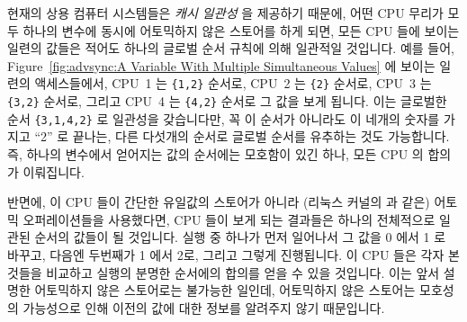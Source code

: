 현재의 상용 컴퓨터 시스템들은 \emph{캐시 일관성} 을 제공하기 때문에, 어떤 CPU
무리가 모두 하나의 변수에 동시에 어토믹하지 않은 스토어를 하게 되면, 모든 CPU
들에 보이는 일련의 값들은 적어도 하나의 글로벌 순서 규칙에 의해 일관적일
것입니다.
예를 들어,
Figure~\ref{fig:advsync:A Variable With Multiple Simultaneous Values} 에 보이는
일련의 액세스들에서,
CPU~1 는 {\tt \{1,2\}} 순서로,
CPU~2 는 {\tt \{2\}} 순서로,
CPU~3 는 {\tt \{3,2\}} 순서로,
그리고
CPU~4 는 {\tt \{4,2\}} 순서로 그 값을 보게 됩니다.
이는 글로벌한 순서 {\tt \{3,1,4,2\}} 로 일관성을 갖습니다만, 꼭 이 순서가
아니라도 이 네개의 숫자를 가지고 ``2'' 로 끝나는, 다른 다섯개의 순서로 글로벌
순서를 유추하는 것도 가능합니다.
즉, 하나의 변수에서 얻어지는 값의 순서에는 모호함이 있긴 하나, 모든 CPU 의
합의가 이뤄집니다.

반면에, 이 CPU 들이 간단한 유일값의 스토어가 아니라 (리눅스 커널의
 과 같은) 어토믹 오퍼레이션들을 사용했다면, CPU 들이
보게 되는 결과들은 하나의 전체적으로 일관된 순서의 값들이 될 것입니다.
 실행 중 하나가 먼저 일어나서 그 값을 0 에서 1 로
바꾸고, 다음엔 두번째가 1 에서 2로, 그리고 그렇게 진행됩니다.
이 CPU 들은 각자 본 것들을 비교하고  실행의 분명한
순서에의 합의를 얻을 수 있을 것입니다.
이는 앞서 설명한 어토믹하지 않은 스토어로는 불가능한 일인데, 어토믹하지 않은
스토어는 모호성의 가능성으로 인해 이전의 값에 대한 정보를 알려주지 않기
때문입니다.

